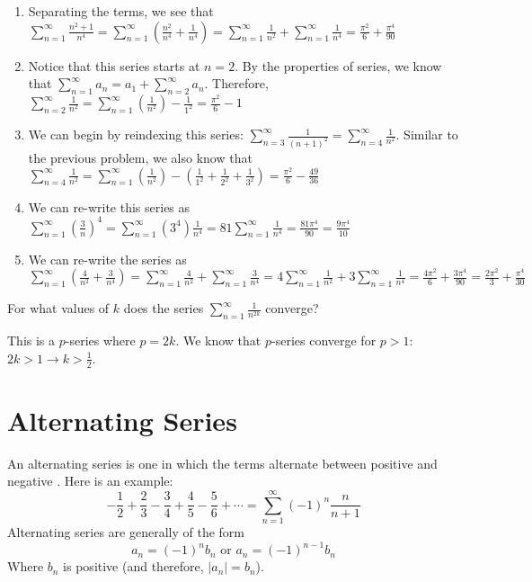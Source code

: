 \begin{Answer}[ref = euler1]
\begin{enumerate}
\item Separating the terms, we see that $\sum_{n=1}^\infty \frac{n^2 + 1}{n^4} 
= \sum_{n=1}^\infty \left( \frac{n^2}{n^4} + \frac{1}{n^4} \right) = \sum_{n=1}
^\infty \frac{1}{n^2} + \sum_{n=1}^\infty \frac{1}{n^4} = \frac{\pi^2}{6} + 
\frac{\pi^4}{90}$
\item Notice that this series starts at $n = 2$. By the properties of series, 
we know that $\sum_{n=1}^\infty a_n = a_1 + \sum_{n=2}^\infty a_n$. Therefore, 
$\sum_{n=2}^\infty \frac{1}{n^2} = \sum_{n=1}^\infty \left( \frac{1}{n^2} 
\right) - \frac{1}{1^2} = \frac{\pi^2}{6} - 1$
\item We can begin by reindexing this series: $\sum_{n=3}^\infty \frac{1}{(n + 
1)^2} = \sum_{n=4}^\infty \frac{1}{n^2}$. Similar to the previous problem, we 
also know that $\sum_{n=4}^\infty \frac{1}{n^2} = \sum_{n=1}^\infty \left( 
\frac{1}{n^2} \right) - \left( \frac{1}{1^2} + \frac{1}{2^2} + \frac{1}{3^2} 
\right) = \frac{\pi^2}{6} - \frac{49}{36}$
\item We can re-write this series as $\sum_{n=1}^\infty \left( \frac{3}{n} 
\right)^4 = \sum_{n=1}^\infty (3^4)\frac{1}{n^4} = 81 \sum_{n=1}^\infty 
\frac{1}{n^4} = \frac{81\pi^4}{90} = \frac{9\pi^4}{10}$
\item We can re-write the series as $\sum_{n=1}^\infty \left( \frac{4}{n^2} + 
\frac{3}{n^4} \right) = \sum_{n=1}^\infty \frac{4}{n^2} + \sum_{n=1}^\infty 
\frac{3}{n^4} = 4 \sum_{n=1}^\infty \frac{1}{n^2} + 3 \sum_{n=1}^\infty 
\frac{1}{n^4} = \frac{4\pi^2}{6} + \frac{3\pi^4}{90} = \frac{2\pi^2}{3} + 
\frac{\pi^4}{30}$
\end{enumerate}
\end{Answer}

\begin{Exercise}[label = pseries1]
For what values of $k$ does the series $\sum_{n = 1}^\infty \frac{1}{n^{2k}}$ 
converge?
\end{Exercise}

\begin{Answer}[ref = pseries1]
This is a $p$-series where $p = 2k$. We know that $p$-series converge for $p > 
1$: $2k > 1 \rightarrow k > \frac{1}{2}$. 
\end{Answer}

\section{Alternating Series}
An alternating series is one in which the terms alternate between positive and 
negative . Here is an example:
$$-\frac{1}{2} + \frac{2}{3} - \frac{3}{4} + \frac{4}{5} - \frac{5}{6} + 
\cdots = \sum_{n=1}^\infty (-1)^n \frac{n}{n + 1}$$
Alternating series are generally of the form
$$a_n = (-1)^n b_n \text{ or } a_n = (-1)^{n - 1} b_n$$
Where $b_n$ is positive (and therefore, $|a_n| = b_n$).

